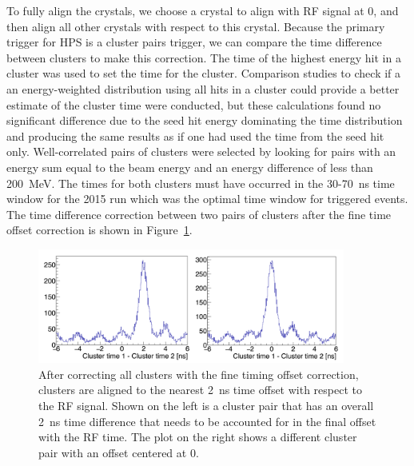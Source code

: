 \documentclass[12pt]{report}
\begin{document}
To fully align the crystals, we choose a crystal to align with RF signal at 0, and then align all other crystals with respect to this crystal. Because the primary trigger for HPS is a cluster pairs trigger, we can compare the time difference between clusters to make this correction. The time of the highest energy hit in a cluster was used to set the time for the cluster. Comparison studies to check if a an energy-weighted distribution using all hits in a cluster could provide a better estimate of the cluster time were conducted, but these calculations found no significant difference due to the seed hit energy dominating the time distribution and producing the same results as if one had used the time from the seed hit only. Well-correlated pairs of clusters were selected by looking for pairs with an energy sum equal to the beam energy and an energy difference of less than 200~MeV. The times for both clusters must have occurred in the 30-70~ns time window for the 2015 run which was the optimal time window for triggered events. The time difference correction between two pairs of clusters after the fine time offset correction is shown in Figure~\ref{Figure:2clusoffset}.

\begin{figure}[H]
  \centering
      \includegraphics[width=0.9\textwidth]{pics/performance/2clusteroffset.png}
  \caption[Time difference between two clusters after fine offset time correction]{After correcting all clusters with the fine timing offset correction, clusters are aligned to the nearest 2~ns time offset with respect to the RF signal. Shown on the left is a cluster pair that has an overall 2~ns time difference that needs to be accounted for in the final offset with the RF time. The plot on the right shows a different cluster pair with an offset centered at 0.}
  \label{Figure:2clusoffset}
\end{figure}
\end{document}
